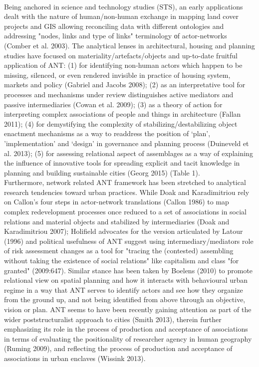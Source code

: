 \documentclass[11pt]{report}
\begin{document}
\\
Being anchored in science and technology studies (STS), an early applications dealt with the nature of human/non-human exchange in mapping land cover projects and GIS allowing reconciling data with different ontologies and addressing "nodes, links and type of links" terminology оf actor-networks (Comber et al. 2003). The analytical lenses in architectural, housing and planning studies have focused on materiality/artefacts/objects and up-to-date fruitful application of ANT: (1) for identifying non-human actors which happen to be missing, silenced, or even rendered invisible in practice of housing system, markets and policy (Gabriel and Jacobs 2008); (2) as an interpretative tool for processes and mechanisms under review distinguishes active mediators and passive intermediaries (Cowan et al. 2009); (3) as a theory of action for interpreting complex associations of people and things in architecture (Fallan 2011); (4) for demystifying the complexity of stabilizing/destabilizing object enactment mechanisms as a way to readdress the position of ‘plan’, ’implementation’ and ‘design’ in governance and planning process (Duineveld et al. 2013); (5) for assessing relational aspect of assemblages as a way of explaining the influence of innovative tools for spreading explicit and tacit knowledge in planning and building sustainable cities (Georg 2015) (Table 1).
\\
Furthermore, network related ANT framework has been stretched to analytical research tendencies toward urban practices. While Doak and Karadimitriou rely on Callon’s four steps in actor-network translations  (Callon 1986) to map complex redevelopment processes once reduced to a set of associations in social relations and material objects and stabilized by intermediaries (Doak and Karadimitriou 2007); Holifield  advocates for the version articulated by Latour (1996) and political usefulness of ANT suggest using  intermediary/mediators role of risk assessment changes as a tool for "tracing the (contested) assembling without taking the existence of social relations" like capitalism and class "for granted" (2009:647). Similar stance has been taken by Boelens (2010) to promote relational view on spatial planning and how it interacts with behavioural urban regime in a way that ANT serves to identify actors and see how they organize from the ground up, and not being identified from above through an objective, vision or plan. ANT seems to have been recently gaining attention as part of the wider poststructuralist approach to cities  (Smith 2013), therein further emphasizing its role in the process of production and acceptance of associations in terms of evaluating the positionality of researcher agency in human geography (Ruming 2009), and  reflecting the process of production and acceptance of associations in urban enclaves (Wissink 2013).
\end{document}
